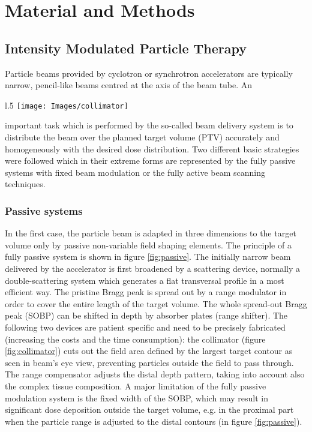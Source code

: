 \documentclass[12pt, a4paper, twoside]{book}
\begin{document}
\chapter{Material and Methods} %

\section{Intensity Modulated Particle Therapy}

Particle beams provided by cyclotron or synchrotron accelerators are typically narrow, pencil-like beams centred at the axis of the beam tube. An 
\begin{wrapfigure}{l}{.5\textwidth}
{\texttt{[image: Images/collimator]}}
\caption{Multileaf Collimator for the shaping of the radiation beam}
\label{fig:collimator}
\vspace{-10mm}
\end{wrapfigure}
\noindent important task which is performed by the so-called beam delivery system is to distribute the beam over the planned target volume (PTV) accurately and homogeneously with the desired dose distribution.
Two different basic strategies were followed which in their extreme forms are represented by the fully passive systems with fixed beam modulation or the fully active beam scanning techniques.


\subsection{Passive systems}
In the first case, the particle beam
is adapted in three dimensions to the target volume only by passive non-variable
field shaping elements.
The principle of a fully passive system is shown in figure \ref{fig:passive}. The initially narrow beam delivered by the accelerator is first broadened by a scattering device, normally a double-scattering system which generates a flat transversal profile in a most efficient way. 
The pristine Bragg peak is spread out by a range modulator in order to cover the entire length of the target volume. The whole spread-out Bragg peak (SOBP) can be shifted in depth by absorber plates (range shifter). 
The following two devices are patient specific and need to be precisely fabricated (increasing the costs and the time consumption): the collimator (figure \ref{fig:collimator}) cuts out the field area defined by the largest target contour as seen in beam’s eye view, preventing particles outside the field to pass through. 
The range compensator adjusts the distal depth pattern, taking into account also the complex tissue composition. A major limitation of the fully passive modulation system is the fixed width of the SOBP, which may result in significant dose deposition outside the target volume, e.g. in the proximal part when the particle range is adjusted to the distal contours (in figure \ref{fig:passive}).
\end{document}
